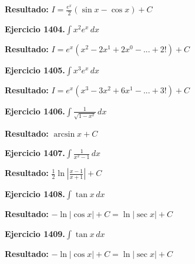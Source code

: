 \documentclass[10pt,a4paper]{article}
\begin{document}
\begin{solbox}
\textbf{Resultado:} \(\displaystyle I = \frac{e^x}{2}(\sin x - \cos x) + C\)
\end{solbox}

\begin{ejbox}
\textbf{Ejercicio 1404.}\quad $\int x^{2} e^x\,dx$
\end{ejbox}

\begin{solbox}
\textbf{Resultado:} \(\displaystyle I = e^x(x^{2} - 2x^{1} + 2x^{0} - ... + 2!) + C\)
\end{solbox}

\newpage
\begin{ejbox}
\textbf{Ejercicio 1405.}\quad $\int x^{3} e^x\,dx$
\end{ejbox}

\begin{solbox}
\textbf{Resultado:} \(\displaystyle I = e^x(x^{3} - 3x^{2} + 6x^{1} - ... + 3!) + C\)
\end{solbox}

\begin{ejbox}
\textbf{Ejercicio 1406.}\quad $\int \frac{1}{\sqrt{1-x^2}}\,dx$
\end{ejbox}

\begin{solbox}
\textbf{Resultado:} \(\displaystyle \arcsin x + C\)
\end{solbox}

\begin{ejbox}
\textbf{Ejercicio 1407.}\quad $\int \frac{1}{x^2-1}\,dx$
\end{ejbox}

\begin{solbox}
\textbf{Resultado:} \(\displaystyle \frac{1}{2}\ln\left|\frac{x-1}{x+1}\right| + C\)
\end{solbox}

\newpage
\begin{ejbox}
\textbf{Ejercicio 1408.}\quad $\int \tan x\,dx$
\end{ejbox}

\begin{solbox}
\textbf{Resultado:} \(\displaystyle -\ln|\cos x| + C = \ln|\sec x| + C\)
\end{solbox}

\begin{ejbox}
\textbf{Ejercicio 1409.}\quad $\int \tan x\,dx$
\end{ejbox}

\begin{solbox}
\textbf{Resultado:} \(\displaystyle -\ln|\cos x| + C = \ln|\sec x| + C\)
\end{solbox}
\end{document}
